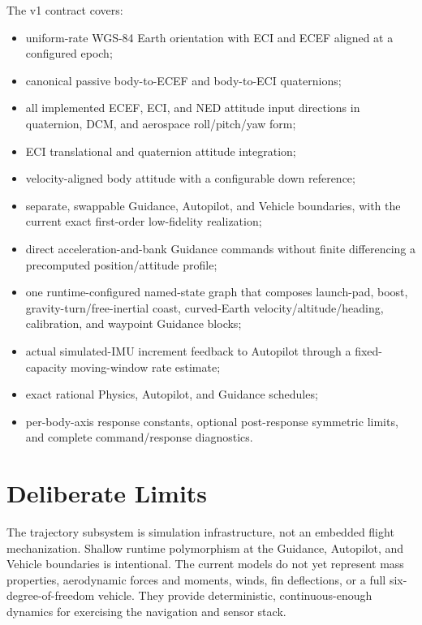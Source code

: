 \begin{scopebox}
The v1 contract covers:
\begin{itemize}
    \item uniform-rate WGS-84 Earth orientation with ECI and ECEF aligned at a
          configured epoch;
    \item canonical passive body-to-ECEF and body-to-ECI quaternions;
    \item all implemented ECEF, ECI, and NED attitude input directions in
          quaternion, DCM, and aerospace roll/pitch/yaw form;
    \item ECI translational and quaternion attitude integration;
    \item velocity-aligned body attitude with a configurable down reference;
    \item separate, swappable Guidance, Autopilot, and Vehicle boundaries,
          with the current exact first-order low-fidelity realization;
    \item direct acceleration-and-bank Guidance commands without finite
          differencing a precomputed position/attitude profile;
    \item one runtime-configured named-state graph that composes launch-pad,
          boost, gravity-turn/free-inertial coast, curved-Earth
          velocity/altitude/heading, calibration, and waypoint Guidance blocks;
    \item actual simulated-IMU increment feedback to Autopilot through a
          fixed-capacity moving-window rate estimate;
    \item exact rational Physics, Autopilot, and Guidance schedules;
    \item per-body-axis response constants, optional post-response symmetric
          limits, and complete command/response diagnostics.
\end{itemize}
\end{scopebox}

\section{Deliberate Limits}

The trajectory subsystem is simulation infrastructure, not an embedded flight
mechanization. Shallow runtime polymorphism at the Guidance, Autopilot, and
Vehicle boundaries is intentional. The current models do not yet represent
mass properties, aerodynamic forces and moments, winds, fin deflections, or a
full six-degree-of-freedom vehicle. They provide deterministic,
continuous-enough dynamics for exercising the navigation and sensor stack.

